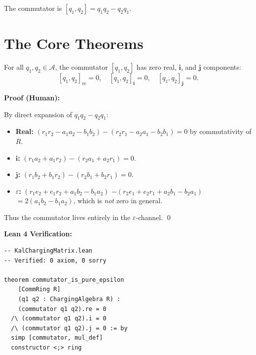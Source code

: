 \begin{definition}[Commutator]
The commutator is $[q_1, q_2] = q_1 q_2 - q_2 q_1$.
\end{definition}

\section{The Core Theorems}
\label{sec:core-theorems}

\begin{theorem}
\label{thm:commutator-pure-eps}
For all $q_1, q_2 \in \mathcal{A}$, the commutator $[q_1, q_2]$ has
zero real, $\mathbf{i}$, and $\mathbf{j}$ components:
\[
  [q_1, q_2]_{\mathrm{re}} = 0, \quad
  [q_1, q_2]_{\mathbf{i}} = 0, \quad
  [q_1, q_2]_{\mathbf{j}} = 0.
\]

\begin{minipage}[t]{0.48\textwidth}
\textbf{Proof (Human):}

By direct expansion of $q_1 q_2 - q_2 q_1$:
\begin{itemize}
  \item \textbf{Real:} $(r_1 r_2 - a_1 a_2 - b_1 b_2) - (r_2 r_1 - a_2 a_1 - b_2 b_1) = 0$ by commutativity of $R$.
  \item \textbf{$\mathbf{i}$:} $(r_1 a_2 + a_1 r_2) - (r_2 a_1 + a_2 r_1) = 0$.
  \item \textbf{$\mathbf{j}$:} $(r_1 b_2 + b_1 r_2) - (r_2 b_1 + b_2 r_1) = 0$.
  \item \textbf{$\varepsilon$:} $(r_1 e_2 + e_1 r_2 + a_1 b_2 - b_1 a_2)$
  $- (r_2 e_1 + e_2 r_1 + a_2 b_1 - b_2 a_1)$
  $= 2(a_1 b_2 - b_1 a_2)$, which is \emph{not} zero in general.
\end{itemize}
Thus the commutator lives entirely in the $\varepsilon$-channel. \qed
\end{minipage}
\hfill
\begin{minipage}[t]{0.48\textwidth}
\textbf{Lean 4 Verification:}
\begin{lstlisting}[language=lean,basicstyle=\ttfamily\scriptsize]
-- KalChargingMatrix.lean
-- Verified: 0 axiom, 0 sorry

theorem commutator_is_pure_epsilon
    [CommRing R]
    (q1 q2 : ChargingAlgebra R) :
    (commutator q1 q2).re = 0
  /\ (commutator q1 q2).i = 0
  /\ (commutator q1 q2).j = 0 := by
  simp [commutator, mul_def]
  constructor <;> ring
\end{lstlisting}
\end{minipage}
\end{theorem}

